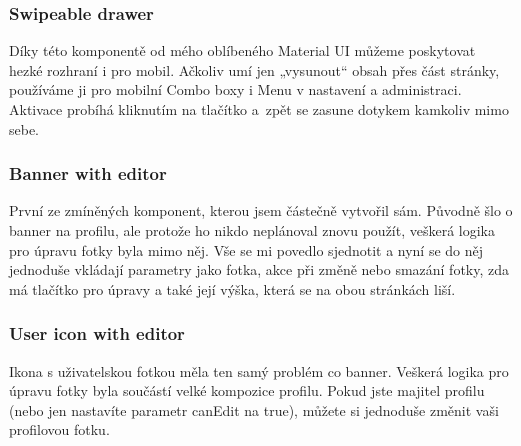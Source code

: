 \subsubsection{Swipeable drawer}
Díky této komponentě od mého oblíbeného Material UI můžeme poskytovat hezké rozhraní i pro mobil. Ačkoliv umí jen „vysunout“ obsah přes část stránky, používáme ji pro mobilní Combo boxy i Menu v nastavení a administraci. Aktivace probíhá kliknutím na tlačítko a~zpět se zasune dotykem kamkoliv mimo sebe.

\subsubsection{Banner with editor}
První ze zmíněných komponent, kterou jsem částečně vytvořil sám. Původně šlo o banner na profilu, ale protože ho nikdo neplánoval znovu použít, veškerá logika pro úpravu fotky byla mimo něj. Vše se mi povedlo sjednotit a nyní se do něj jednoduše vkládají parametry jako fotka, akce při změně nebo smazání fotky, zda má tlačítko pro úpravy a také její výška, která se na obou stránkách liší.

\subsubsection{User icon with editor}
Ikona s uživatelskou fotkou měla ten samý problém co banner. Veškerá logika pro úpravu fotky byla součástí velké kompozice profilu. Pokud jste majitel profilu (nebo jen nastavíte parametr canEdit na true), můžete si jednoduše změnit vaši profilovou fotku.

